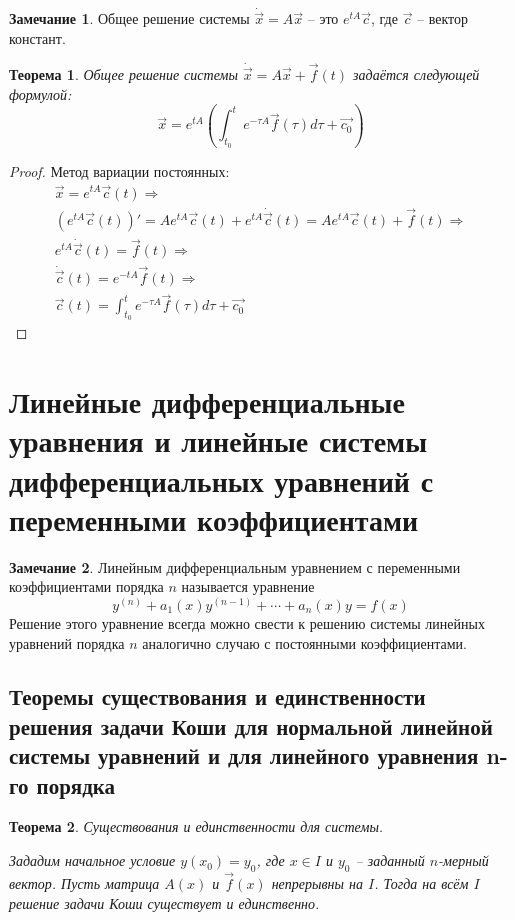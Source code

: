 \documentclass[a4paper,12pt]{article}
\theoremstyle{plain}
\newtheorem{theorem}{Теорема}[section]
\theoremstyle{definition}
\newtheorem*{note}{Замечание}
\theoremstyle{remark}
\begin{document}
\begin{note}
	Общее решение системы $\dot{\vec{x}} = A\vec{x}$ -- это $e^{tA}\vec{c}$, где $\vec{c}$ -- вектор констант.
\end{note}

\begin{theorem}
	Общее решение системы $\dot{\vec{x}} = A\vec{x} + \vec{f}(t)$ задаётся следующей формулой:
	\[\vec{x} = e^{tA}\left(\int_{t_0}^te^{-\tau A}\vec{f}(\tau)d\tau + \vec{c_0}\right)\]
\end{theorem}
\begin{proof}
	Метод вариации постоянных:
	\begin{align*}
		\vec{x} = e^{tA}\vec{c}(t) \Rightarrow                                                                        \\
		(e^{tA}\vec{c}(t))' = Ae^{tA}\vec{c}(t) + e^{tA}\dot{\vec{c}}(t) = Ae^{tA}\vec{c}(t) + \vec{f}(t) \Rightarrow \\
		e^{tA}\dot{\vec{c}}(t) = \vec{f}(t) \Rightarrow                                                               \\
		\dot{\vec{c}}(t) = e^{-tA}\vec{f}(t) \Rightarrow                                                              \\
		\vec{c}(t) = \int_{t_0}^t e^{-\tau A}\vec{f}(\tau)d\tau + \vec{c_0}
	\end{align*}
\end{proof}

\section{Линейные дифференциальные уравнения и линейные системы дифференциальных уравнений с переменными коэффициентами}
\begin{note}
	Линейным дифференциальным уравнением с переменными коэффициентами порядка $n$ называется уравнение
	\[y^{(n)} + a_1(x)y^{(n-1)}+\cdots + a_n(x)y = f(x)\]
	Решение этого уравнение всегда можно свести к решению системы линейных уравнений порядка $n$ аналогично случаю с постоянными коэффициентами.
\end{note}

\subsection{Теоремы существования и единственности решения задачи Коши для нормальной линейной системы уравнений и для линейного уравнения n-го порядка}
\begin{theorem}
	Существования и единственности для системы.

	Зададим начальное условие $y(x_0) = y_0$, где $x \in I$ и $y_0$ -- заданный $n$-мерный вектор. Пусть матрица $A(x)$ и $\vec{f}(x)$ непрерывны на $I$. Тогда на всём $I$ решение задачи Коши существует и единственно.
\end{theorem}
\end{document}

